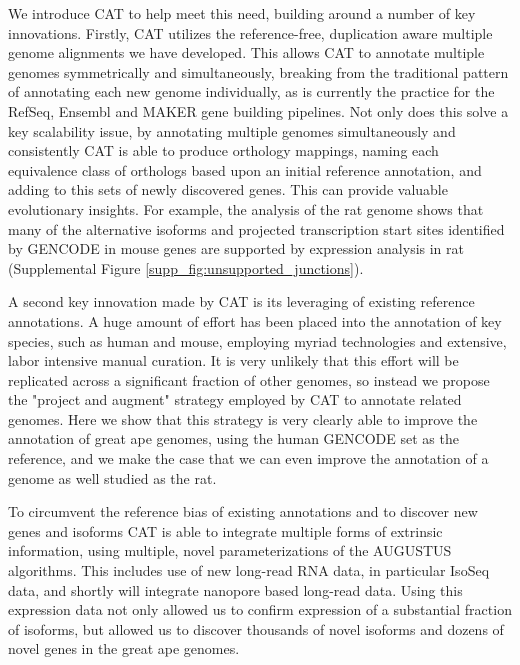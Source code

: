 \documentclass[fleqn,10pt]{wlscirep}
\begin{document}
We introduce CAT to help meet this need, building around a number of key innovations. 
Firstly, CAT utilizes the reference-free, duplication aware multiple genome alignments we have developed. This allows CAT to annotate multiple genomes symmetrically and simultaneously, breaking from the traditional pattern of annotating each new genome individually, as is currently the practice for the RefSeq, Ensembl and MAKER gene building pipelines.
Not only does this solve a key scalability issue, 
by annotating multiple genomes simultaneously and consistently CAT is able to produce orthology mappings, naming each equivalence class of orthologs based upon an initial reference annotation, and adding to this sets of newly discovered genes. This can provide valuable evolutionary insights. For example, the analysis of the rat genome shows that many of the alternative isoforms and projected transcription start sites identified by GENCODE in mouse genes are supported by expression analysis in rat (Supplemental Figure \ref{supp_fig:unsupported_junctions}).

A second key innovation made by CAT is its leveraging of existing reference annotations. A huge amount of effort has been placed into the annotation of key species, such as human and mouse, employing myriad technologies and extensive, labor intensive manual curation. It is very unlikely that this effort will be replicated across a significant fraction of other genomes, so instead we propose the "project and augment" strategy employed by CAT to annotate related genomes. Here we show that this strategy is very clearly able to improve the annotation of great ape genomes, using the human GENCODE set as the reference, and we make the case that we can even improve the annotation of a genome as well studied as the rat. 

To circumvent the reference bias of existing annotations and to discover new genes and isoforms CAT is able to integrate multiple forms of extrinsic information, using multiple, novel parameterizations of the AUGUSTUS algorithms. This includes use of new long-read RNA data, in particular IsoSeq data, and shortly will integrate nanopore based long-read data\cite{byrne2017nanopore}. Using this expression data not only allowed us to confirm expression of a substantial fraction of isoforms, but allowed us to discover thousands of novel isoforms and dozens of novel genes in the great ape genomes.
\end{document}

